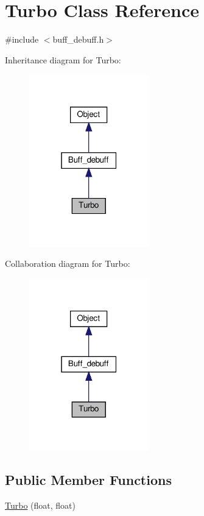 \hypertarget{classTurbo}{}\section{Turbo Class Reference}
\label{classTurbo}


{\ttfamily \#include $<$buff\+\_\+debuff.\+h$>$}



Inheritance diagram for Turbo\+:\nopagebreak
\begin{figure}[H]
\begin{center}
\leavevmode
\includegraphics[width=147pt]{classTurbo__inherit__graph}
\end{center}
\end{figure}


Collaboration diagram for Turbo\+:\nopagebreak
\begin{figure}[H]
\begin{center}
\leavevmode
\includegraphics[width=147pt]{classTurbo__coll__graph}
\end{center}
\end{figure}
\subsection*{Public Member Functions}
\begin{DoxyCompactItemize}
\item 
\hyperlink{classTurbo_a11c88626d73b3b4d3462e4b96f4b715c}{Turbo} (float, float)
\end{DoxyCompactItemize}
